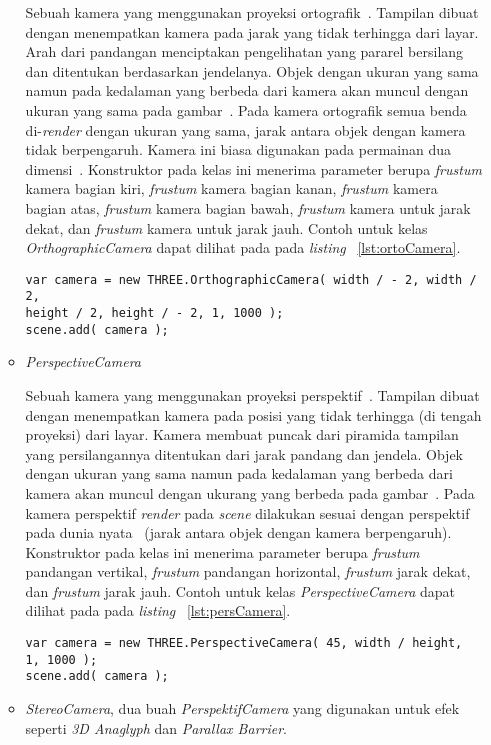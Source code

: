 \begin{itemize}
\begin{itemize}
		Sebuah kamera yang menggunakan proyeksi ortografik~\cite{threejs}. Tampilan dibuat dengan menempatkan kamera pada jarak yang tidak terhingga dari layar. Arah dari pandangan menciptakan pengelihatan yang pararel bersilang dan ditentukan berdasarkan jendelanya. Objek dengan ukuran yang sama namun pada kedalaman yang berbeda dari kamera akan muncul dengan ukuran yang sama pada gambar~\cite{siggraph}. Pada kamera ortografik semua benda di-{\it render} dengan ukuran yang sama, jarak antara objek dengan kamera tidak berpengaruh. Kamera ini biasa digunakan pada permainan dua dimensi~\cite{learningThreejs}. 
		Konstruktor pada kelas ini menerima parameter berupa {\it frustum} kamera bagian kiri, {\it frustum} kamera bagian kanan, {\it frustum} kamera bagian atas, {\it frustum} kamera bagian bawah, {\it frustum} kamera untuk jarak dekat, dan {\it frustum} kamera untuk jarak jauh. Contoh untuk kelas {\it OrthographicCamera} dapat dilihat pada pada {\it listing} ~\ref{lst:ortoCamera}.
\begin{lstlisting}[caption={Contoh instansiasi kelas {\it OrthographicCamera}}, label={lst:ortoCamera},captionpos=b]
var camera = new THREE.OrthographicCamera( width / - 2, width / 2, 
height / 2, height / - 2, 1, 1000 );
scene.add( camera );
\end{lstlisting}
		\item {\it PerspectiveCamera}
		
		Sebuah kamera yang menggunakan proyeksi perspektif~\cite{threejs}. Tampilan dibuat dengan menempatkan kamera pada posisi yang tidak terhingga (di tengah proyeksi) dari layar. Kamera membuat puncak dari piramida tampilan yang persilangannya ditentukan dari jarak pandang dan jendela. Objek dengan ukuran yang sama namun pada kedalaman yang berbeda dari kamera akan muncul dengan ukurang yang berbeda pada gambar~\cite{siggraph}. Pada kamera perspektif {\it render} pada {\it scene} dilakukan sesuai dengan perspektif pada dunia nyata~\cite{learningThreejs} (jarak antara objek dengan kamera berpengaruh).
		Konstruktor pada kelas ini menerima parameter berupa {\it frustum} pandangan vertikal, {\it frustum} pandangan horizontal, {\it frustum} jarak dekat, dan {\it frustum} jarak jauh. Contoh untuk kelas {\it PerspectiveCamera} dapat dilihat pada pada {\it listing} ~\ref{lst:persCamera}.
\begin{lstlisting}[caption={Contoh instansiasi kelas {\it PerspectiveCamera}}, label={lst:persCamera},captionpos=b]
var camera = new THREE.PerspectiveCamera( 45, width / height, 
1, 1000 );
scene.add( camera );
\end{lstlisting}
		\item {\it StereoCamera}, dua buah {\it PerspektifCamera} yang digunakan untuk efek seperti {\it 3D Anaglyph} dan {\it Parallax Barrier}.
	\end{itemize}
	

\end{itemize}
